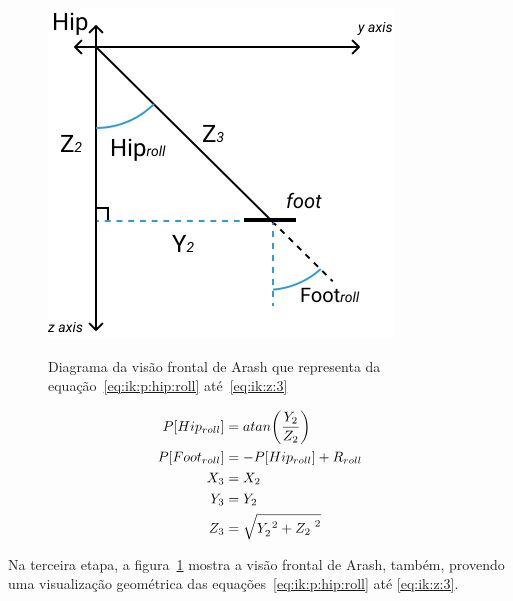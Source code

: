 \begin{figure}[htb]
	\centering
	\includegraphics[scale=1.5]{imagens/svg/inverse-kinematics-frontalview}
	\caption{Diagrama da visão frontal de Arash que representa da equação~\ref{eq:ik:p:hip:roll} até~\ref{eq:ik:z:3}}
	\caption*{\cite{karimionline}}
	\label{fig:ik:frontalview}
\end{figure}

\begin{align}
	 P[Hip_{roll}] &= atan\bigg(\dfrac{Y_2}{Z_2}\bigg)                    \label{eq:ik:p:hip:roll}     \\
	P[Foot_{roll}] &= -P[Hip_{roll}] + R_{roll}                            \label{eq:ik:p:foot:roll}    \\
			   X_3 &= X_2                                                   \label{eq:ik:x:3}            \\
			   Y_3 &= Y_2                                                    \label{eq:ik:y:3}            \\
	           Z_3 &= \sqrt{Y_2^{\hspace{1mm}2} + {Z_2}^{\hspace{1mm}2}}      \label{eq:ik:z:3}
\end{align}

Na terceira etapa, a figura~\ref{fig:ik:frontalview} mostra a visão frontal de Arash, também, provendo uma visualização geométrica das equações~\ref{eq:ik:p:hip:roll} até \ref{eq:ik:z:3}.

